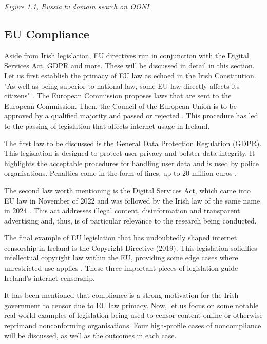 \centerline{\textit{Figure 1.1, Russia.tv domain search on OONI}}

\subsection{EU Compliance}
\label{sec:Chris-EU-Compliance}

Aside from Irish legislation, EU directives run in conjunction with the Digital Services Act, GDPR and more. These will be discussed in detail in this section. Let us first establish the primacy of EU law as echoed in the Irish Constitution. "As well as being superior to national law, some EU law directly affects its citizens" \cite{citizensinformation2025}. The European Commission proposes laws that are sent to the European Commission. Then, the Council of the European Union is to be approved by a qualified majority and passed or rejected \cite{europa2025}. This procedure has led to the passing of legislation that affects internet usage in Ireland. 

The first law to be discussed is the General Data Protection Regulation (GDPR). This legislation is designed to protect user privacy and bolster data integrity. It highlights the acceptable procedures for handling user data and is used by police organisations. Penalties come in the form of fines, up to 20 million euros \cite{gdprinfo2025}.

The second law worth mentioning is the Digital Services Act, which came into EU law in November of 2022 and was followed by the Irish law of the same name in 2024 \cite{enterprisegovie2025} \cite{irishstatutebook2024}. This act addresses illegal content, disinformation and transparent advertising and, thus, is of particular relevance to the research being conducted. 

The final example of EU legislation that has undoubtedly shaped internet censorship in Ireland is the Copyright Directive (2019). This legislation solidifies intellectual copyright law within the EU, providing some edge cases where unrestricted use applies \cite{EUCopyright}. These three important pieces of legislation guide Ireland's internet censorship. 

It has been mentioned that compliance is a strong motivation for the Irish government to censor due to EU law primacy. Now, let us focus on some notable real-world examples of legislation being used to censor content online or otherwise reprimand nonconforming organisations. Four high-profile cases of noncompliance will be discussed, as well as the outcomes in each case. 

